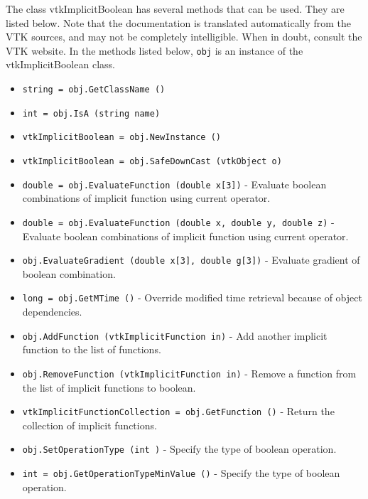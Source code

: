 The class vtkImplicitBoolean has several methods that can be used.
  They are listed below.
Note that the documentation is translated automatically from the VTK sources,
and may not be completely intelligible.  When in doubt, consult the VTK website.
In the methods listed below, \verb|obj| is an instance of the vtkImplicitBoolean class.
\begin{itemize}
\item  \verb|string = obj.GetClassName ()|

\item  \verb|int = obj.IsA (string name)|

\item  \verb|vtkImplicitBoolean = obj.NewInstance ()|

\item  \verb|vtkImplicitBoolean = obj.SafeDownCast (vtkObject o)|

\item  \verb|double = obj.EvaluateFunction (double x[3])| -  Evaluate boolean combinations of implicit function using current operator.

\item  \verb|double = obj.EvaluateFunction (double x, double y, double z)| -  Evaluate boolean combinations of implicit function using current operator.

\item  \verb|obj.EvaluateGradient (double x[3], double g[3])| -  Evaluate gradient of boolean combination.

\item  \verb|long = obj.GetMTime ()| -  Override modified time retrieval because of object dependencies.

\item  \verb|obj.AddFunction (vtkImplicitFunction in)| -  Add another implicit function to the list of functions.

\item  \verb|obj.RemoveFunction (vtkImplicitFunction in)| -  Remove a function from the list of implicit functions to boolean.

\item  \verb|vtkImplicitFunctionCollection = obj.GetFunction ()| -  Return the collection of implicit functions.

\item  \verb|obj.SetOperationType (int )| -  Specify the type of boolean operation.

\item  \verb|int = obj.GetOperationTypeMinValue ()| -  Specify the type of boolean operation.


\end{itemize}
